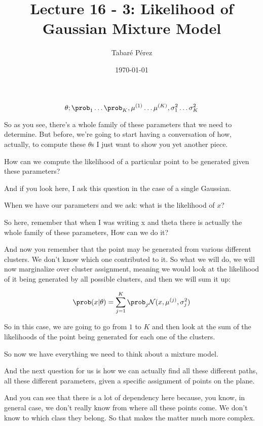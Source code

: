 \documentclass[a4paper, 12pt]{article}
\author{Tabaré Pérez}
\date{\today}
\title{Lecture 16 - 3: Likelihood of Gaussian Mixture Model}
\begin{document}
\maketitle
\begin{equation}
\label{eq:orgbe71e82}
\theta; \prob_1 \ldots \prob_K, \mu^{(1)} \ldots \mu^{(K)}, \sigma_{1}^{2} \ldots \sigma_{K}^{2}
\end{equation}

So as you see, there's a whole family of these parameters that we need to
determine. But before, we're going to start having a conversation of how,
actually, to compute these \(\theta\)s I just want to show you yet another
piece.

How can we compute the likelihood of a particular point to be generated given
these parameters?

And if you look here, I ask this question in the case of a single Gaussian.

When we have our parameters and we ask: what is the likelihood of \(x\)?

So here, remember that when I was writing x and theta there is actually the
whole family of these parameters, How can we do it?

And now you remember that the point may be generated from various different
clusters. We don't know which one contributed to it. So what we will do, we will
now marginalize over cluster assignment, meaning we would look at the likelihood
of it being generated by all possible clusters, and then we will sum it up:

\begin{equation}
\label{eq:orgd694d46}
\prob(x|\theta) = \sum_{j=1}^{K} \prob_j \mathcal{N}(x, \mu^{(j)}, \sigma_{j}^{2})
\end{equation}

So in this case, we are going to go from \(1\) to \(K\)
and then look at the sum of the likelihoods of the point being
generated for each one of the clusters.

So now we have everything we need
to think about a mixture model.

And the next question for us is how we can actually
find all these different paths, all these different parameters,
given a specific assignment of points on the plane.

And you can see that there is a lot of dependency here
because, you know, in general case,
we don't really know from where all these points come.
We don't know to which class they belong.
So that makes the matter much more complex.
\end{document}
